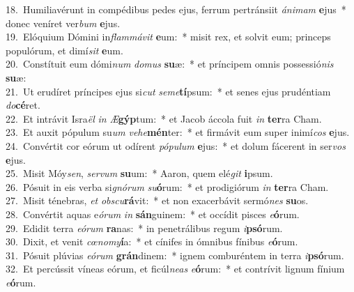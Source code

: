 {18.~}Humiliavérunt in compédibus pedes ejus, ferrum pertránsiit \textit{á}\textit{ni}\textit{mam} \textbf{e}jus~* donec veníret ver\textit{bum} \textbf{e}jus.\\
{19.~}Elóquium Dómini in\textit{flam}\textit{má}\textit{vit} \textbf{e}um:~* misit rex, et solvit eum; princeps populórum, et dimí\textit{sit} \textbf{e}um.\\
{20.~}Constítuit eum dómi\textit{num} \textit{do}\textit{mus} \textbf{su}æ:~* et príncipem omnis possessió\textit{nis} \textbf{su}æ:\\
{21.~}Ut erudíret príncipes ejus si\textit{cut} \textit{se}\textit{me}\textbf{tí}psum:~* et senes ejus prudéntiam \textit{do}\textbf{cé}ret.\\
{22.~}Et intrávit Isra\textit{ël} \textit{in} \textit{Æ}\textbf{gýp}tum:~* et Jacob áccola fuit \textit{in} \textbf{ter}ra Cham.\\
{23.~}Et auxit pópulum su\textit{um} \textit{ve}\textit{he}\textbf{mén}ter:~* et firmávit eum super inimí\textit{cos} \textbf{e}jus.\\
{24.~}Convértit cor eórum ut odírent \textit{pó}\textit{pu}\textit{lum} \textbf{e}jus:~* et dolum fácerent in ser\textit{vos} \textbf{e}jus.\\
{25.~}Misit Móy\textit{sen}, \textit{ser}\textit{vum} \textbf{su}um:~* Aaron, quem elé\textit{git} \textbf{i}psum.\\
{26.~}Pósuit in eis verba si\textit{gnó}\textit{rum} \textit{su}\textbf{ó}rum:~* et prodigiórum \textit{in} \textbf{ter}ra Cham.\\
{27.~}Misit ténebras, \textit{et} \textit{ob}\textit{scu}\textbf{rá}vit:~* et non exacerbávit sermó\textit{nes} \textbf{su}os.\\
{28.~}Convértit aquas e\textit{ó}\textit{rum} \textit{in} \textbf{sán}guinem:~* et occídit pisces \textit{e}\textbf{ó}rum.\\
{29.~}Edidit terra \textit{e}\textit{ó}\textit{rum} \textbf{ra}nas:~* in penetrálibus regum \textit{i}\textbf{psó}rum.\\
{30.~}Dixit, et venit \textit{cœ}\textit{no}\textit{my}\textbf{í}a:~* et cínifes in ómnibus fínibus \textit{e}\textbf{ó}rum.\\
{31.~}Pósuit plúvias \textit{e}\textit{ó}\textit{rum} \textbf{grán}dinem:~* ignem comburéntem in terra \textit{i}\textbf{psó}rum.\\
{32.~}Et percússit víneas eórum, et ficúl\textit{ne}\textit{as} \textit{e}\textbf{ó}rum:~* et contrívit lignum fínium \textit{e}\textbf{ó}rum.\\
